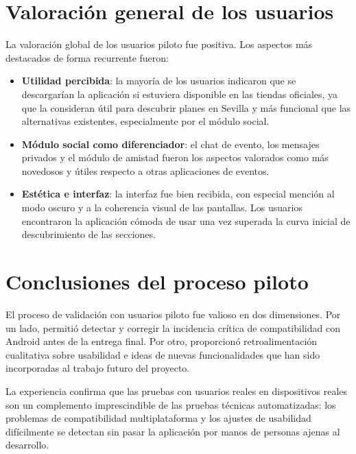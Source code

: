 \section{Valoración general de los usuarios}

La valoración global de los usuarios piloto fue positiva. Los aspectos más destacados de forma recurrente fueron:

\begin{itemize}
    \item \textbf{Utilidad percibida}: la mayoría de los usuarios indicaron que se descargarían la aplicación si estuviera disponible en las tiendas oficiales, ya que la consideran útil para descubrir planes en Sevilla y más funcional que las alternativas existentes, especialmente por el módulo social.

    \item \textbf{Módulo social como diferenciador}: el chat de evento, los mensajes privados y el módulo de amistad fueron los aspectos valorados como más novedosos y útiles respecto a otras aplicaciones de eventos.

    \item \textbf{Estética e interfaz}: la interfaz fue bien recibida, con especial mención al modo oscuro y a la coherencia visual de las pantallas. Los usuarios encontraron la aplicación cómoda de usar una vez superada la curva inicial de descubrimiento de las secciones.
\end{itemize}

\section{Conclusiones del proceso piloto}

El proceso de validación con usuarios piloto fue valioso en dos dimensiones. Por un lado, permitió detectar y corregir la incidencia crítica de compatibilidad con Android antes de la entrega final. Por otro, proporcionó retroalimentación cualitativa sobre usabilidad e ideas de nuevas funcionalidades que han sido incorporadas al trabajo futuro del proyecto.

La experiencia confirma que las pruebas con usuarios reales en dispositivos reales son un complemento imprescindible de las pruebas técnicas automatizadas: los problemas de compatibilidad multiplataforma y los ajustes de usabilidad difícilmente se detectan sin pasar la aplicación por manos de personas ajenas al desarrollo.
